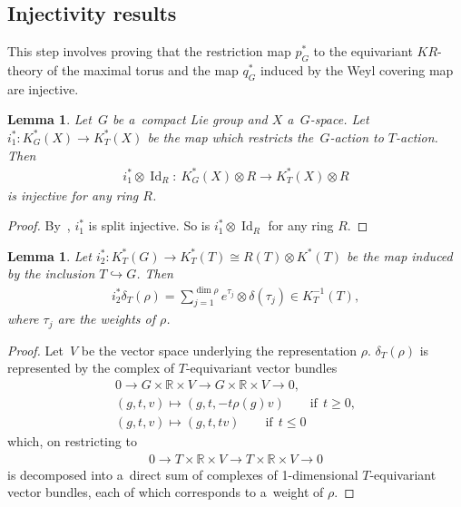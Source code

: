 \documentclass[11pt]{article}
\numberwithin{equation}{section}
\newtheorem{Lemma}[Theorem]{Lemma}
\DeclareMathOperator{\Id}{Id}
\begin{document}
\subsection{Injectivity results}
This step involves proving that the restriction map $p_G^*$ to the equivariant $KR$-theory of the maximal torus and the
map $q_G^*$ induced by the Weyl covering map are injective.
\begin{Lemma}
\label{ringinj}
Let~$G$ be a~compact Lie group and $X$ a~$G$-space.
Let $i_1^*: K_G^*(X)\to K^*_T(X)$ be the map which restricts the~$G$-action to $T$-action.
Then
\begin{gather*}
i_1^*\otimes\Id_R: \  K^*_G(X)\otimes R\to K_T^*(X)\otimes R
\end{gather*}
is injective for any ring $R$.
\end{Lemma}
\begin{proof}
By~\cite[Proposition 4.9]{At4}, $i_1^*$ is split injective.
So is $i_1^*\otimes\Id_R$ for any ring $R$.
\end{proof}
\begin{Lemma}
\label{decomposition}
Let $i_2^*: K_T^*(G)\to K_T^*(T)\cong R(T)\otimes K^*(T)$ be the map induced by the inclusion $T\hookrightarrow G$.
Then
\begin{gather*}
i_2^*\delta_T(\rho)=
\sum\limits_{j=1}^{\dim\rho}e^{\tau_j}\otimes\delta(\tau_j)\in K_T^{-1}(T),
\end{gather*}
where $\tau_j$ are the weights of $\rho$.
\end{Lemma}
\begin{proof}
Let~$V$ be the vector space underlying the representation $\rho$.
$\delta_T(\rho)$ is represented by the complex of $T$-equivariant vector bundles
\begin{gather*}
0\longrightarrow G\times\mathbb{R}\times V \longrightarrow G\times\mathbb{R}\times V\longrightarrow 0,
\\
(g, t, v)  \mapsto  (g, t, -t\rho(g)v) \qquad\text{if} \ \ t\geq 0,
\\
(g, t, v)  \mapsto  (g, t, tv) \qquad\text{if} \ \ t\leq 0
\end{gather*}
which, on restricting to
\begin{gather*}
0\longrightarrow T\times\mathbb{R}\times V
\stackrel{}
{\longrightarrow}T\times\mathbb{R}\times V\longrightarrow 0
\end{gather*}
is decomposed into a~direct sum of complexes of 1-dimensional $T$-equivariant vector bundles, each of which corresponds
to a~weight of $\rho$.
\end{proof}
\end{document}

